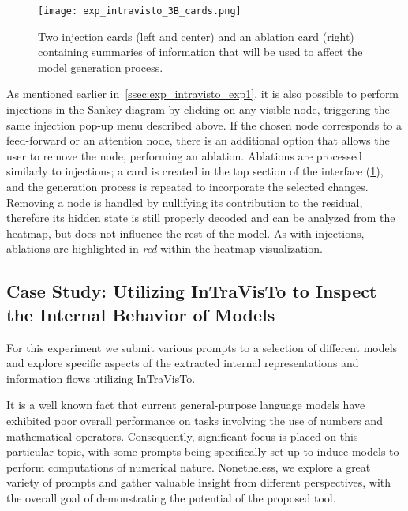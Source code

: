 \begin{figure}[t!]
    \centering
    \texttt{[image: exp\_intravisto\_3B\_cards.png]}
    \caption[Injection and ablation cards containing summaries of information that will be used to affect the model generation process.]{Two injection cards (left and center) and an ablation card (right) containing summaries of information that will be used to affect the model generation process.}
    \label{fig:exp_intravisto_3_B}
\end{figure}

As mentioned earlier in~\cref{ssec:exp_intravisto_exp1}, it is also possible to perform injections in the Sankey diagram by clicking on any visible node, triggering the same injection pop-up menu described above.
If the chosen node corresponds to a feed-forward or an attention node, there is an additional option that allows the user to remove the node, performing an ablation.
Ablations are processed similarly to injections; a card is created in the top section of the interface (\cref{fig:exp_intravisto_3_B}), and the generation process is repeated to incorporate the selected changes.
Removing a node is handled by nullifying its contribution to the residual, therefore its hidden state is still properly decoded and can be analyzed from the heatmap, but does not influence the rest of the model.
As with injections, ablations are highlighted in \emph{red} within the heatmap visualization.

\subsection{Case Study: Utilizing InTraVisTo to Inspect the Internal Behavior of Models}\label{ssec:exp_intravisto_exp4}

For this experiment we submit various prompts to a selection of different models and explore specific aspects of the extracted internal representations and information flows utilizing InTraVisTo.

It is a well known fact that current general-purpose language models have exhibited poor overall performance on tasks involving the use of numbers and mathematical operators.
Consequently, significant focus is placed on this particular topic, with some prompts being specifically set up to induce models to perform computations of numerical nature.
Nonetheless, we explore a great variety of prompts and gather valuable insight from different perspectives, with the overall goal of demonstrating the potential of the proposed tool.

